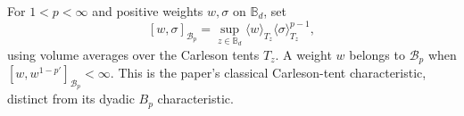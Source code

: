 
For $1<p<\infty$ and positive weights $w,\sigma$ on $\mathbb B_d$, set
\[
[w,\sigma]_{\mathcal B_p}
=\sup_{z\in\mathbb B_d}
\langle w\rangle_{T_z}\langle\sigma\rangle_{T_z}^{p-1},
\]
using volume averages over the Carleson tents $T_z$. A weight $w$ belongs to $\mathcal B_p$ when $[w,w^{1-p'}]_{\mathcal B_p}<\infty$. This is the paper's classical Carleson-tent characteristic, distinct from its dyadic $B_p$ characteristic.
